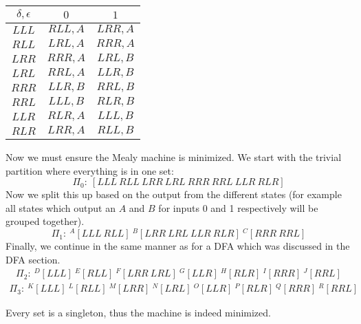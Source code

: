 \documentclass{scrartcl}
\begin{document}
\begin{center}
\begin{tabular} {|c|c c|}
\hline
$\delta,\epsilon$&$0$&$1$\\
\hline
$LLL$  & $RLL,A$  & $LRR,A$  \\
\hline
$RLL$  & $LRL,A$  & $RRR,A$  \\
\hline
$LRR$  & $RRR,A$  & $LRL,B$ \\
\hline
$LRL$  & $RRL,A$  & $LLR,B$ \\
\hline
$RRR$  & $LLR,B$ & $RRL,B$ \\
\hline
$RRL$  & $LLL,B$ & $RLR,B$ \\
\hline
$LLR$ & $RLR,A$  & $LLL,B$ \\
\hline
$RLR$  & $LRR,A$  & $RLL,B$ \\
\hline
\end{tabular}
\end{center}
Now we must ensure the Mealy machine is minimized. We start with the trivial
partition where everything is in one set:
$$\Pi_0 :\ [LLL\ RLL\ LRR\ LRL\ RRR\ RRL\ LLR\ RLR]$$
Now we split this up based on the output from the different states (for example
all states which output an $A$ and $B$ for inputs 0 and 1 respectively will be
grouped together).
$$\Pi_1 :\ ^A[LLL\ RLL]\ ^B[LRR\ LRL\ LLR\ RLR]\ ^C[RRR\ RRL]$$
Finally, we continue in the same manner as for a DFA which was discussed in the
DFA section.
\begin{align*}
\Pi_2 :\ ^D[LLL]\ 
         ^E[RLL]\ 
         ^F[LRR\ LRL]\
         ^G[LLR]\ 
         ^H[RLR]\ 
         ^I[RRR]\ 
         ^J[RRL]
\end{align*}
\begin{align*}
\Pi_3 :\ ^K[LLL]\ 
         ^L[RLL]\ 
         ^M[LRR]\ 
         ^N[LRL]\
         ^O[LLR]\ 
         ^P[RLR]\ 
         ^Q[RRR]\ 
         ^R[RRL]
\end{align*}

Every set is a singleton, thus the machine is indeed minimized. 
\end{document}
